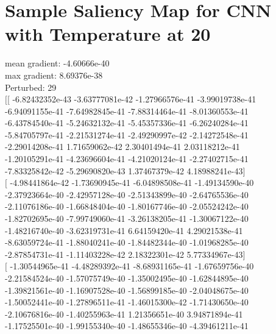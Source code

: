 \documentclass{article}
\begin{document}
\newpage
\section{Sample Saliency Map for CNN with Temperature at 20}
mean gradient: -4.60666e-40\\
max gradient: 8.69376e-38\\
Perturbed: 29\\
$[$[ -6.82432352e-43  -3.63777081e-42  -1.27966576e-41  -3.99019738e-41\\
   -6.94091155e-41  -7.64982845e-41  -7.88314464e-41  -8.01360553e-41\\
   -6.43784540e-41  -5.24632132e-41  -5.45357336e-41  -6.26240284e-41\\
   -5.84705797e-41  -2.21531274e-41  -2.49290997e-42  -2.14272548e-41\\
   -2.29014208e-41   1.71659062e-42   2.30401494e-41   2.03118212e-41\\
   -1.20105291e-41  -4.23696604e-41  -4.21020124e-41  -2.27402715e-41\\
   -7.83325842e-42  -5.29690820e-43   1.37467379e-42   4.18988241e-43$]$\\
 $[$ -4.98441864e-42  -1.73690945e-41  -6.04898508e-41  -1.49134590e-40\\
   -2.37923664e-40  -2.42957128e-40  -2.51343899e-40  -2.64765536e-40\\
   -2.11076186e-40  -1.66848404e-40  -1.80167746e-40  -2.05524242e-40\\
   -1.82702695e-40  -7.99749060e-41  -3.26138205e-41  -1.30067122e-40\\
   -1.48216740e-40  -3.62319731e-41   6.64159420e-41   4.29021538e-41\\
   -8.63059724e-41  -1.88040241e-40  -1.84482344e-40  -1.01968285e-40\\
   -2.87854731e-41  -1.11403228e-42   2.18322301e-42   5.77334967e-43$]$\\
 $[$ -1.30544965e-41  -4.48289392e-41  -8.68931165e-41  -1.67659756e-40\\
   -2.21584524e-40  -1.57075749e-40  -1.35002495e-40  -1.62844895e-40\\
   -1.39821561e-40  -1.16907528e-40  -1.56899185e-40  -2.04048675e-40\\
   -1.50052441e-40  -1.27896511e-41  -1.46015300e-42  -1.71430650e-40\\
   -2.10676816e-40  -1.40255963e-41   1.21356651e-40   3.94871894e-41\\
   -1.17525501e-40  -1.99155340e-40  -1.48655346e-40  -4.39461211e-41\\
\end{document}
